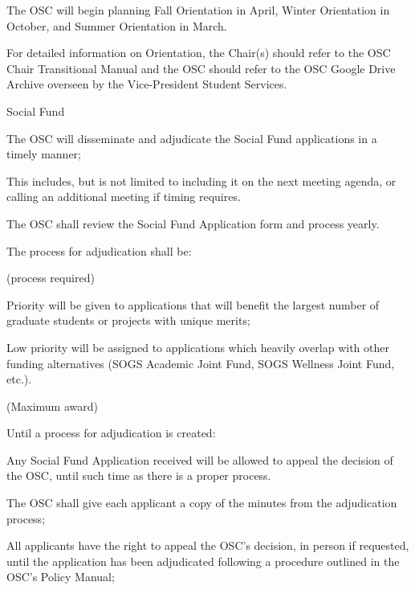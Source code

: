 \begin{longenum}[ label*=\thesubsection.\arabic*., align=left]
\begin{longenum}[label*=\arabic*., align=left]
		\item The OSC will begin planning Fall Orientation in April, Winter Orientation in October, and Summer Orientation in March.
		\item For detailed information on Orientation, the Chair(s) should refer to the OSC Chair Transitional Manual and the OSC should refer to the OSC Google Drive Archive overseen by the Vice-President Student Services.				
		\end{longenum}

	\item Social Fund
		\begin{longenum}[label*=\arabic*., align=left]
		\item The OSC will disseminate and adjudicate the Social Fund applications in a timely manner;
			\begin{longenum}[label*=\arabic*., align=left]
			\item This includes, but is not limited to including it on the next meeting agenda, or calling an additional meeting if timing requires.
			\end{longenum}
		\item The OSC shall review the Social Fund Application form and process yearly.
		\item The process for adjudication shall be:				
			\begin{longenum}[label*=\arabic*., align=left]
			\item (process required)
			\item Priority will be given to applications that will benefit the largest number of graduate students or projects with unique merits;	
			\item Low priority will be assigned to applications which heavily overlap with other funding alternatives (SOGS Academic Joint Fund, SOGS Wellness Joint Fund, etc.).			
			\item (Maximum award)			
			\item Until a process for adjudication is created:			
				\begin{longenum}[label*=\arabic*., align=left]
				\item Any Social Fund Application received will be allowed to appeal the decision of the OSC, until such time as there is a proper process.
					\begin{longenum}[label*=\arabic*., align=left]
					\item The OSC shall give each applicant a copy of the minutes from the adjudication process;
					\item All applicants have the right to appeal the OSC's decision, in person if requested, until the application has been adjudicated following a procedure outlined in the OSC's Policy Manual;

\end{longenum}
\end{longenum}
\end{longenum}
\end{longenum}
\end{longenum}
